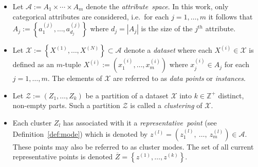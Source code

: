 \begin{itemize}
    \item Let \(\mathcal{A} := A_1 \times \cdots \times A_m\) denote the
        \emph{attribute~space}. In this work, only categorical attributes are
        considered, i.e.\ for each \(j = 1, \ldots, m\) it follows that \(A_j :=
        \left\{a_1^{(j)}, \ldots, a_{d_j}^{(j)}\right\}\) where \(d_j = |A_j|\)
        is the size of the \(j^{th}\) attribute.

    \item Let \(\mathcal{X} := \left\{X^{(1)}, \ldots, X^{(N)}\right\} \subset
        \mathcal{A}\) denote a \emph{dataset} where each \(X^{(i)} \in
        \mathcal{X}\) is defined as an \(m\)-tuple \(X^{(i)} := \left(x_1^{(i)},
        \ldots, x_m^{(i)}\right)\) where \(x_j^{(i)} \in A_j\) for each \(j = 1,
        \ldots, m\). The elements of \(\mathcal{X}\) are referred to as
        \emph{data points} or \emph{instances}.

    \item Let \(\mathcal{Z} := \left(Z_1, \ldots, Z_k\right)\) be a partition
        of a dataset \(\mathcal{X}\) into \(k \in \mathbb{Z}^{+}\) distinct,
        non-empty parts. Such a partition \(\mathcal{Z}\) is called a
        \emph{clustering} of \(\mathcal{X}\).

    \item Each cluster \(Z_l\) has associated with it a
        \emph{representative~point} (see Definition~\ref{def:mode}) which is
        denoted by \(z^{(l)} = \left(z_1^{(l)},~\ldots,~z_m^{(l)}\right) \in
        \mathcal{A}\).  These points may also be referred to as cluster modes.
        The set of all current representative points is denoted \(\overline Z =
        \left\{z^{(1)}, \ldots, z^{(k)}\right\}\).
\end{itemize}

